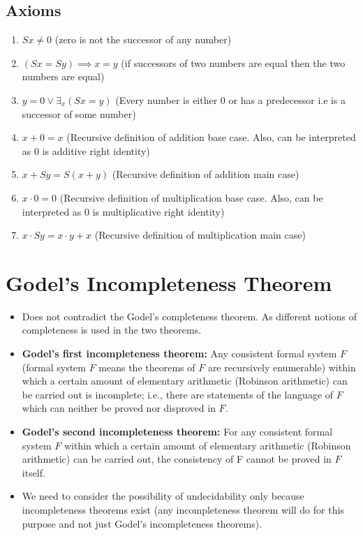 \documentclass[
11pt,notheorems,hyperref={pdfauthor=whatever}
]{beamer}
\begin{document}
\subsection{Axioms}
\begin{frame}
    \begin{enumerate}
        \setlength\itemsep{2em}
        \item $Sx \not= 0$ (zero is not the successor of any number)
        \item $(Sx = Sy) \implies x = y$ (if successors of two numbers are equal then the two numbers are equal)
        \item $y = 0 \vee \exists_x (Sx = y)$ (Every number is either 0 or has a predecessor i.e is a successor of some number)
        \item $x + 0 = x$ (Recursive definition of addition base case. Also, can be interpreted as $0$ is additive right identity)
        \item $x + Sy = S(x+y)$ (Recursive definition of addition main case)
        \item $x \cdot 0 = 0$ (Recursive definition of multiplication base case. Also, can be interpreted as $0$ is multiplicative right identity)
        \item $x \cdot Sy = x \cdot y + x$ (Recursive definition of multiplication main case)
    \end{enumerate}
\end{frame}

\section{Godel's Incompleteness Theorem}
\begin{frame}
\begin{itemize}
    \setlength\itemsep{1em}
    \item Does not contradict the Godel's completeness theorem. As different notions of completeness is used in the two theorems.
    \item \textbf{Godel's first incompleteness theorem: } Any consistent formal system $F$ (formal system $F$ means the theorems of $F$ are recursively enumerable) within which a certain amount of elementary arithmetic (Robinson arithmetic) can be carried out is incomplete; i.e., there are statements of the language of $F$ which can neither be proved nor disproved in $F$. \cite{raatikainen2013godel}
    \item \textbf{Godel's second incompleteness theorem: } For any consistent formal system $F$ within which a certain amount of elementary arithmetic (Robinson arithmetic) can be carried out, the consistency of F cannot be proved in $F$ itself. \cite{raatikainen2013godel}
    \item We need to consider the possibility of undecidability only because incompleteness theorems exist (any incompleteness theorem will do for this purpose and not just Godel's incompleteness theorems).
\end{itemize}
\end{frame}
\end{document}
